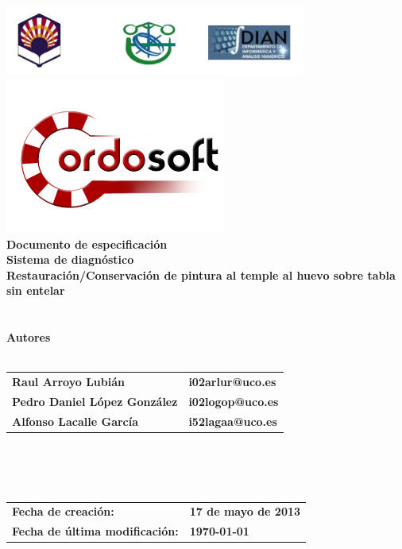 \documentclass[a4paper,11pt]{article}
\begin{document}
	\begin{titlepage}
		\begin{center}
			\includegraphics[width=375px]{Universidad.png} \\
            \includegraphics[width=275px]{logo_cordosoft.png} \\
			\textbf{\LARGE Documento de especificación} \\
			\textbf{\Large Sistema de diagnóstico} \\
			\textbf{Restauración/Conservación de pintura al temple al huevo sobre tabla
			sin entelar} \\
			\\
			\textbf{}
			\\
			\textbf{Autores}
			\\
			\textbf{}
			\\
			\begin{tabular}{l l}
				\textbf{Raul Arroyo Lubián} & \textbf{i02arlur@uco.es} \\	
				\textbf{Pedro Daniel López González} & \textbf{i02logop@uco.es} \\
				\textbf{Alfonso Lacalle García} & \textbf{i52lagaa@uco.es} \\
			\end{tabular}
			\\
			\textbf{}
			\\
			\textbf{}
			\\
			\begin{tabular}{l l}
				\textbf{Fecha de creación:} & \textbf{17 de mayo de 2013} \\
				\textbf{Fecha de última modificación:} & \textbf{\today } \\
			\end{tabular}
		\end{center}
    \end{titlepage}
\end{document}
